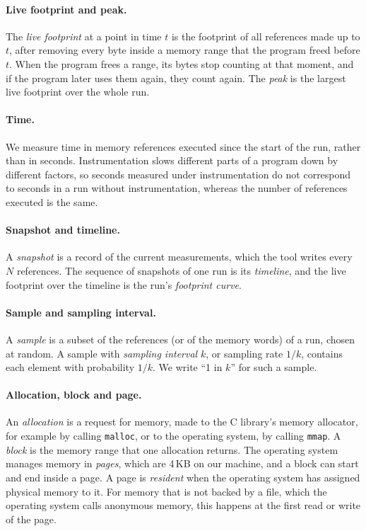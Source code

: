 \documentclass[11pt]{article}
\newcommand{\term}[1]{\emph{#1}}
\begin{document}
\paragraph{Live footprint and peak.}
The \term{live footprint} at a point in time $t$ is the footprint of all references made up to $t$, after removing every byte inside a memory range that the program freed before $t$. When the program frees a range, its bytes stop counting at that moment, and if the program later uses them again, they count again. The \term{peak} is the largest live footprint over the whole run.

\paragraph{Time.}
We measure time in memory references executed since the start of the run, rather than in seconds. Instrumentation slows different parts of a program down by different factors, so seconds measured under instrumentation do not correspond to seconds in a run without instrumentation, whereas the number of references executed is the same.

\paragraph{Snapshot and timeline.}
A \term{snapshot} is a record of the current measurements, which the tool writes every $N$ references. The sequence of snapshots of one run is its \term{timeline}, and the live footprint over the timeline is the run's \term{footprint curve}.

\paragraph{Sample and sampling interval.}
A \term{sample} is a subset of the references (or of the memory words) of a run, chosen at random. A sample with \term{sampling interval} $k$, or sampling rate $1/k$, contains each element with probability $1/k$. We write ``1 in $k$'' for such a sample.

\paragraph{Allocation, block and page.}
An \term{allocation} is a request for memory, made to the C library's memory allocator, for example by calling \texttt{malloc}, or to the operating system, by calling \texttt{mmap}. A \term{block} is the memory range that one allocation returns. The operating system manages memory in \term{pages}, which are 4\,KB on our machine, and a block can start and end inside a page. A page is \term{resident} when the operating system has assigned physical memory to it. For memory that is not backed by a file, which the operating system calls anonymous memory, this happens at the first read or write of the page.
\end{document}
